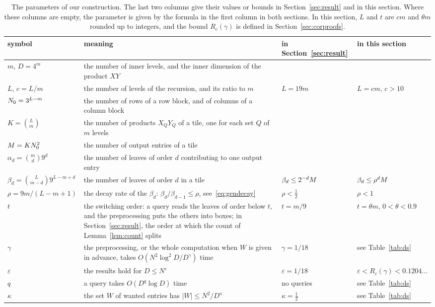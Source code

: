 \begin{table}[!t]
\centering
\small
\renewcommand{\arraystretch}{1.25}
\begin{tabular}{@{}l>{\raggedright\arraybackslash}p{6.3cm}ll@{}}
symbol & meaning & in Section~\ref{sec:result} & in this section\\\hline
$m$, $D=4^m$ & the number of inner levels, and the inner dimension of the product $XY$ & & \\
$L$, $c=L/m$ & the number of levels of the recursion, and its ratio to $m$ & $L=19m$ & $L=cm$, $c>10$\\
$N_0=3^{L-m}$ & the number of rows of a row block, and of columns of a column block & & \\
$K=\binom Lm$ & the number of products $X_QY_Q$ of a tile, one for each set $Q$ of $m$ levels & & \\
$M=KN_0^2$ & the number of output entries of a tile & & \\
$\alpha_d=\binom md9^d$ & the number of leaves of order $d$ contributing to one output entry & & \\
$\beta_d=\binom L{m-d}9^{L-m+d}$ & the number of leaves of order $d$ in a tile & $\beta_d\le2^{-d}M$ & $\beta_d\le\rho^dM$\\
$\rho=9m/(L-m+1)$ & the decay rate of the $\beta_d$: $\beta_d/\beta_{d-1}\le\rho$, see~\eqref{eq:gendecay} & $\rho<\frac12$ & $\rho<1$\\
$t$ & the switching order: a query reads the leaves of order below $t$, and the preprocessing puts the others into boxes; in Section~\ref{sec:result}, the order at which the count of Lemma~\ref{lem:count} splits & $t=m/9$ & $t=\theta m$, $0<\theta<0.9$\\
$\gamma$ & the preprocessing, or the whole computation when $W$ is given in advance, takes $O(N^2\log^2\!D/D^{\gamma})$ time & $\gamma=1/18$ & see Table~\ref{tab:ds}\\
$\varepsilon$ & the results hold for $D\le N^{\varepsilon}$ & $\varepsilon=1/18$ & $\varepsilon<R_c(\gamma)<0.1204\ldots$\\
$q$ & a query takes $O(D^{q}\log D)$ time & no queries & see Table~\ref{tab:ds}\\
$\kappa$ & the set $W$ of wanted entries has $|W|\le N^2/D^{\kappa}$ & $\kappa=\frac12$ & see Table~\ref{tab:ds}
\end{tabular}
\caption{The parameters of our construction. The last two columns give their values or bounds in Section~\ref{sec:result} and in this section. Where these columns are empty, the parameter is given by the formula in the first column in both sections. In this section, $L$ and $t$ are $cm$ and $\theta m$ rounded up to integers, and the bound $R_c(\gamma)$ is defined in Section~\ref{sec:corproofs}.}
\label{tab:params}
\end{table}

